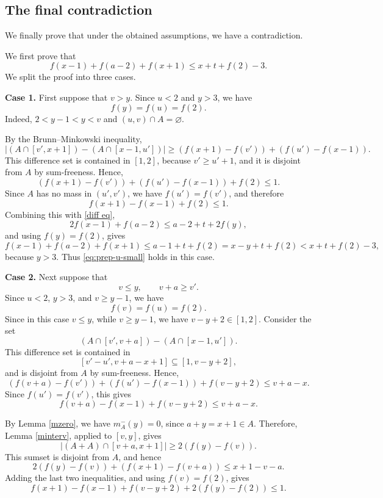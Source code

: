 \documentclass[11pt,reqno]{amsart}
\theoremstyle{definition}
\def\F#1{f(#1)}
\begin{document}
\subsection{The final contradiction}
We finally prove that under the obtained assumptions, we have a contradiction.

We first prove that
    \begin{equation}\label{eq:prep-u-small}
        \F{x-1}+\F{a-2}+\F{x+1}\leq x+t+\F{2}-3.
    \end{equation}
    We split the proof into three cases.
\medskip

\noindent\textbf{Case 1.}       First suppose that $v>y$. Since $u<2$ and $y>3$, we have
    $$
        \F{y}=\F{u}=\F{2}.
    $$
    Indeed, $2<y-1<y<v$ and $(u,v)\cap A=\varnothing$.

    By the Brunn--Minkowski inequality,
    $$
        \bigl|(A\cap[v',x+1])-(A\cap[x-1,u'])\bigr|
        \geq
        (\F{x+1}-\F{v'})+(\F{u'}-\F{x-1}).
    $$
    This difference set is contained in $[1,2]$, because $v'\geq u'+1$, and it
    is disjoint from $A$ by sum-freeness. Hence,  
    $$
        (\F{x+1}-\F{v'})+(\F{u'}-\F{x-1})+\F{2}\leq1.
    $$
    Since $A$ has no mass in $(u',v')$, we have $\F{u'}=\F{v'}$, and therefore
    $$
        \F{x+1}-\F{x-1}+\F{2}\leq1.
    $$
    Combining this with \eqref{diff eq},
    $$
        2\F{x-1}+\F{a-2}\leq a-2+t+2\F{y},
    $$
    and using $\F{y}=\F{2}$, gives
    $$
        \F{x-1}+\F{a-2}+\F{x+1}
        \leq
        a-1+t+\F{2}
        =
        x-y+t+\F{2}
        <
        x+t+\F{2}-3,
    $$
    because $y>3$. Thus \eqref{eq:prep-u-small} holds in this case.
\medskip

\noindent\textbf{Case 2.}
        Next suppose that
    $$
        v\leq y,\qquad v+a\geq v'.
    $$
    Since $u<2$, $y>3$, and $v\geq y-1$, we have
    $$
        \F{v}=\F{u}=\F{2}.
    $$
    Since in this case $v\leq y$, while $v\geq y-1$, we have
$
    v-y+2\in[1,2].
$
    Consider the set
    $$
        (A\cap[v',v+a])-(A\cap[x-1,u']).
    $$
    This difference set is contained in
    $$
        [v'-u',v+a-x+1]\subseteq[1,v-y+2],
    $$
    and is disjoint from $A$ by sum-freeness. Hence,
    $$
        (\F{v+a}-\F{v'})+(\F{u'}-\F{x-1})+\F{v-y+2}
        \leq v+a-x.
    $$
    Since $\F{u'}=\F{v'}$, this gives
    $$
        \F{v+a}-\F{x-1}+\F{v-y+2}\leq v+a-x.
    $$

    By Lemma \ref{mzero}, we have $m_A^-(y)=0$, since $a+y=x+1\in A$.
    Therefore,   Lemma \ref{minterv}, applied to $[v,y]$, gives
    $$
        |(A+A)\cap[v+a,x+1]|\geq 2(\F{y}-\F{v}).
    $$
    This sumset is disjoint from $A$, and hence
    $$
        2(\F{y}-\F{v})+(\F{x+1}-\F{v+a})\leq x+1-v-a.
    $$
    Adding the last two inequalities, and using $\F{v}=\F{2}$, gives
    $$
        \F{x+1}-\F{x-1}+\F{v-y+2}+2(\F{y}-\F{2})\leq1.
    $$
\end{document}
